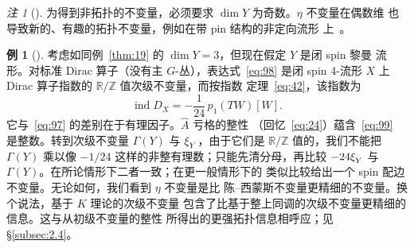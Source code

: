 \documentclass[11pt]{amsart}
\theoremstyle{definition}
\newtheorem{example}[equation]{例}
\theoremstyle{remark}
\newtheorem{remark}[equation]{注}
\theoremstyle{plain}
\numberwithin{equation}{section}
\renewcommand{\:}{\colon}
\newcommand{\Ahat}{{\hat A}}
\newcommand{\RR}{{\mathbb R}}
\newcommand{\ZZ}{{\mathbb Z}}
\DeclareMathOperator{\ind}{ind}
\DeclareRobustCommand{\mstrut}{^{\vphantom{1*\prime y\vee M}}}
\newcommand{\RZ}{\RR/\ZZ}
\newcommand{\xia}[1]{\xi \mstrut _{#1}}
\begin{document}
  \begin{remark}[]\label{thm:21}
 为得到非拓扑的不变量，必须要求 $\dim Y$ 为奇数。$\eta$ 不变量在偶数维
 也导致新的、有趣的拓扑不变量，例如在带 pin 结构的非定向流形
 上~\cite{Gi2}。
  \end{remark}

  \begin{example}[]\label{thm:22}
 考虑如同例~\ref{thm:19} 的 $\dim Y=3$，但现在假定 $Y$ 是闭 spin 黎曼
流形。对标准 Dirac 算子（没有主 $G$-丛），表达式~\eqref{eq:98} 是闭
spin 4-流形 $X$ 上 Dirac 算子指数的 $\RZ$ 值次级不变量，而按指数
定理~\eqref{eq:42}，该指数为
  \begin{equation}\label{eq:99}
     \ind D_X = -\frac{1}{24}\,p_1(TW)[W]. 
  \end{equation}
它与~\eqref{eq:97} 的差别在于有理因子。$\Ahat$ 亏格的整性
（回忆~\eqref{eq:24}）蕴含~\eqref{eq:99} 是整数。转到次级不变量
$\Gamma (Y)$ 与 $\xia Y$，由于它们是 $\RZ$ 值的，我们不能把
$\Gamma (Y)$ 乘以像 $-1/24$ 这样的非整有理数；只能先清分母，再比较
$-24\xia Y$ 与 $\Gamma (Y)$。在所论情形下二者一致；在更一般情形下的
类似比较给出一个 spin 配边不变量。无论如何，我们看到 $\eta$ 不变量是比
陈–西蒙斯不变量更精细的不变量。换个说法，基于 $K$ 理论的次级不变量
包含了比基于整上同调的次级不变量更精细的信息。这与从初级不变量的整性
所得出的更强拓扑信息相呼应；见 \S\ref{subsec:2.4}。
  \end{example}
\end{document}
